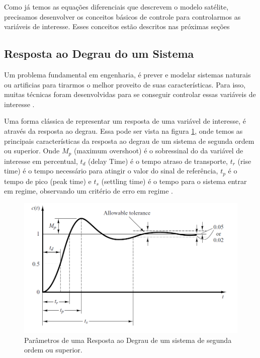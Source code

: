 Como já temos as equações diferenciais que descrevem o modelo satélite, precisamos desenvolver os conceitos básicos de controle para controlarmos as variáveis de interesse. Esses conceitos estão descritos nas próximas seções



\subsection{Resposta ao Degrau do um Sistema}

Um problema fundamental em engenharia, é prever e modelar sistemas naturais ou artificias para tirarmos o melhor proveito de suas características. Para isso, muitas técnicas foram desenvolvidas para se conseguir controlar essas variáveis de interesse \cite{Levine1996}.

Uma forma clássica de representar um resposta de uma variável de interesse, é através da resposta ao degrau. Essa pode ser vista na figura \ref{fig:transient_ogata_p170}, onde temos as principais características da resposta ao degrau de um sistema de segunda ordem ou superior. Onde \textit{$M_p$} (maximum overshoot) é o sobressinal do da variável de interesse em percentual, \textit{$t_d$} (delay Time) é o tempo atraso de transporte, \textit{$t_r$} (rise time) é o tempo necessário para atingir o valor do sinal de referência, \textit{$t_p$} é o tempo de pico (peak time) e \textit{$t_s$} (settling time) é o tempo para o sistema entrar em regime, observando um critério de erro em regime \cite{Ogata}.

\begin{figure}[!ht]
  \caption{Parâmetros de uma Resposta ao Degrau de um sistema de segunda ordem ou superior.}
  \begin{center}
      \includegraphics[scale=0.5]{img/transient_ogata_p170}
  \end{center}
  \label{fig:transient_ogata_p170}
\end{figure}

